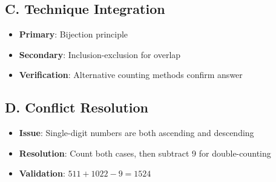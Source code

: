 \documentclass[]{article}
\begin{document}
\begin{techniquesbox}
\subsection*{C. Technique Integration}
\begin{itemize}[leftmargin=*]
    \item \textbf{Primary}: Bijection principle
    \item \textbf{Secondary}: Inclusion-exclusion for overlap
    \item \textbf{Verification}: Alternative counting methods confirm answer
\end{itemize}

\subsection*{D. Conflict Resolution}
\begin{itemize}[leftmargin=*]
    \item \textbf{Issue}: Single-digit numbers are both ascending and descending
    \item \textbf{Resolution}: Count both cases, then subtract 9 for double-counting
    \item \textbf{Validation}: $511 + 1022 - 9 = 1524$
\end{itemize}
\end{techniquesbox}
\end{document}
